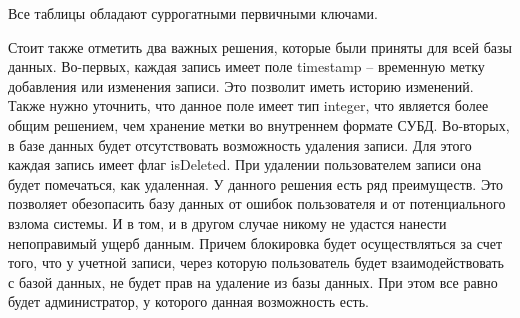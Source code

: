 Все таблицы обладают суррогатными первичными ключами.

Стоит также отметить два важных решения, которые были приняты для всей базы данных.
Во-первых, каждая запись имеет поле timestamp -- временную метку добавления или изменения записи.
Это позволит иметь историю изменений. Также нужно уточнить, что данное поле имеет тип integer,
что является более общим решением, чем хранение метки во внутреннем формате СУБД.
Во-вторых, в базе данных будет отсутствовать возможность удаления записи. Для этого каждая
запись имеет флаг isDeleted. При удалении пользователем записи она будет помечаться, как удаленная.
У данного решения есть ряд преимуществ. Это позволяет обезопасить базу данных от ошибок пользователя
и от потенциального взлома системы. И в том, и в другом случае никому не удастся нанести
непоправимый ущерб данным. Причем блокировка будет осуществляться за счет того, что у учетной записи,
через которую пользователь будет взаимодействовать с базой данных, не будет прав на удаление из базы данных.
При этом все равно будет администратор, у которого данная возможность есть.